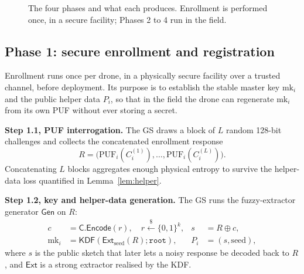 \documentclass[journal]{IEEEtran}
\begin{document}
\begin{figure}[H]
\centering
{}
\caption{The four phases and what each produces. Enrollment is performed once,
in a secure facility; Phases 2 to 4 run in the field.}
\label{fig:overview}
\end{figure}

\subsection{Phase 1: secure enrollment and registration}
\label{sec:p1}

Enrollment runs once per drone, in a physically secure facility over a trusted
channel, before deployment. Its purpose is to establish the stable master key
$\text{mk}_i$ and the public helper data $P_i$, so that in the field the drone
can regenerate $\text{mk}_i$ from its own PUF without ever storing a secret.

\textbf{Step 1.1, PUF interrogation.} The GS draws a block of $L$ random
128-bit challenges and collects the concatenated enrollment response
\begin{equation}
R = \big(\mathrm{PUF}_i(C_i^{(1)}), \dots, \mathrm{PUF}_i(C_i^{(L)})\big).
\end{equation}
Concatenating $L$ blocks aggregates enough physical entropy to survive the
helper-data loss quantified in Lemma~\ref{lem:helper}.

\textbf{Step 1.2, key and helper-data generation.} The GS runs the
fuzzy-extractor generator $\mathsf{Gen}$ on $R$:
\begin{align}
c &= \mathsf{C}.\mathsf{Encode}(r), \quad r \xleftarrow{\$} \{0,1\}^{k}, &
s &= R \oplus c, \label{eq:gen}\\
\text{mk}_i &= \mathsf{KDF}(\mathsf{Ext}_{\text{seed}}(R); \texttt{root}), &
P_i &= (s, \text{seed}),
\end{align}
where $s$ is the public sketch that later lets a noisy response be decoded back
to $R$, and $\mathsf{Ext}$ is a strong extractor realised by the KDF.
\end{document}
